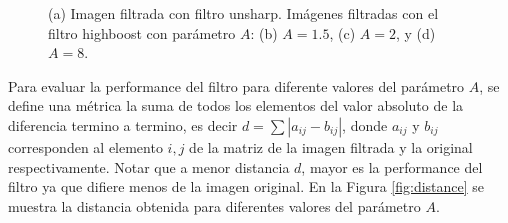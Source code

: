 \documentclass[11pt, twocolumn]{article}
\begin{document}
\begin{figure}[htbp]
  \centering
  \hfill
  \hfill
  \hfill
  \hfill
  \caption{(a) Imagen filtrada con filtro unsharp. Imágenes filtradas con el filtro highboost con parámetro $A$: (b) $A = 1.5$, (c) $A = 2$, y (d) $A = 8$.}
  \label{fig:figuras_ej_6_filtered}
\end{figure}

Para evaluar la performance del filtro para diferente valores del parámetro $A$, se define una métrica la suma de todos los elementos del valor absoluto de la diferencia termino a termino, es decir $d = \sum \left|a_{ij} - b_{ij}\right|$, donde $a_{ij}$ y $b_{ij}$ corresponden al elemento $i, j$ de la matriz de la imagen filtrada y la original respectivamente. Notar que a menor distancia $d$, mayor es la performance del filtro ya que difiere menos de la imagen original. En la Figura \ref{fig:distance} se muestra la distancia obtenida para diferentes valores del parámetro $A$.
\end{document}
